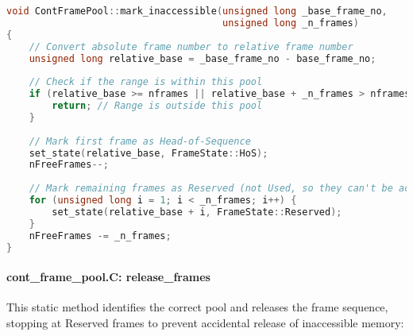 \documentclass{article}
\begin{document}
\begin{lstlisting}[language=C++, caption=Mark Inaccessible Method]
void ContFramePool::mark_inaccessible(unsigned long _base_frame_no,
                                      unsigned long _n_frames)
{
    // Convert absolute frame number to relative frame number
    unsigned long relative_base = _base_frame_no - base_frame_no;
    
    // Check if the range is within this pool
    if (relative_base >= nframes || relative_base + _n_frames > nframes) {
        return; // Range is outside this pool
    }
    
    // Mark first frame as Head-of-Sequence
    set_state(relative_base, FrameState::HoS);
    nFreeFrames--;
    
    // Mark remaining frames as Reserved (not Used, so they can't be accidentally released)
    for (unsigned long i = 1; i < _n_frames; i++) {
        set_state(relative_base + i, FrameState::Reserved);
    }
    nFreeFrames -= _n_frames;
}
\end{lstlisting}

\paragraph{cont\_frame\_pool.C: release\_frames} This static method identifies the correct pool and releases the frame sequence, stopping at Reserved frames to prevent accidental release of inaccessible memory:
\end{document}
